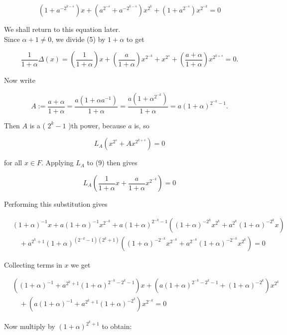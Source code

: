 \documentclass[10pt]{article}
\begin{document}
\begin{equation*}
\left(1+a^{-2^{k-s}}\right) x+\left(a^{2^{-s}}+a^{-2^{k-s}}\right) x^{2^{k}}+\left(1+a^{2^{-s}}\right) x^{2^{-k}}=0 \tag{8}
\end{equation*}


We shall return to this equation later.\\
Since $\alpha+1 \neq 0$, we divide (5) by $1+\alpha$ to get


\begin{equation*}
\frac{1}{1+\alpha} \Delta(x)=\left(\frac{1}{1+\alpha}\right) x+\left(\frac{a}{1+\alpha}\right) x^{2^{-k}}+x^{2^{s}}+\left(\frac{a+\alpha}{1+\alpha}\right) x^{2^{k+s}}=0 . \tag{9}
\end{equation*}


Now write

$$
A:=\frac{a+\alpha}{1+\alpha}=\frac{a\left(1+\alpha a^{-1}\right)}{1+\alpha}=\frac{a\left(1+\alpha^{2^{-k}}\right)}{1+\alpha}=a(1+\alpha)^{2^{-k}-1} .
$$

Then $A$ is a ( $2^{k}-1$ )th power, because $a$ is, so

$$
L_{A}\left(x^{2^{s}}+A x^{2^{k+s}}\right)=0
$$

for all $x \in F$. Applying $L_{A}$ to (9) then gives

$$
L_{A}\left(\frac{1}{1+\alpha} x+\frac{a}{1+\alpha} x^{2^{-k}}\right)=0
$$

Performing this substitution gives

$$
\begin{aligned}
& (1+\alpha)^{-1} x+a(1+\alpha)^{-1} x^{2^{-k}}+a(1+\alpha)^{2^{-k}-1}\left((1+\alpha)^{-2^{k}} x^{2^{k}}+a^{2^{k}}(1+\alpha)^{-2^{k}} x\right) \\
& \quad+a^{2^{k}+1}(1+\alpha)^{\left(2^{-k}-1\right)\left(2^{k}+1\right)}\left((1+\alpha)^{-2^{-k}} x^{2^{-k}}+a^{2^{-k}}(1+\alpha)^{-2^{-k}} x^{2^{k}}\right)=0
\end{aligned}
$$

Collecting terms in $x$ we get

$$
\begin{aligned}
& \left((1+\alpha)^{-1}+a^{2^{k}+1}(1+\alpha)^{2^{-k}-2^{k}-1}\right) x+\left(a(1+\alpha)^{2^{-k}-2^{k}-1}+(1+\alpha)^{-2^{k}}\right) x^{2^{k}} \\
& \quad+\left(a(1+\alpha)^{-1}+a^{2^{k}+1}(1+\alpha)^{-2^{k}}\right) x^{2^{-k}}=0
\end{aligned}
$$

Now multiply by $(1+\alpha)^{2^{k}+1}$ to obtain:
\end{document}
